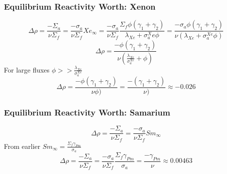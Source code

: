 \documentclass[]{article}
\begin{document}
		\subsubsection*{Equilibrium Reactivity Worth: Xenon}
		\[
		\Delta \rho = \frac{-\Sigma_a}{\nu\Sigma_f} = \frac{-\sigma_a}{\nu\Sigma_f} Xe_\infty = \frac{-\sigma_a}{\nu\Sigma_f} \frac{\Sigma_f\phi(\gamma_1+\gamma_2)}{\lambda_{Xe}+\sigma_a^Xe \phi} = \frac{-\sigma_a\phi(\gamma_1+\gamma_2)}{\nu(\lambda_{Xe}+\sigma_a^{Xe}\phi)}
		\]
		\[
		\Delta \rho = \frac{-\phi(\gamma_1+\gamma_2)}{\nu(\frac{\lambda_{Xe}}{\sigma_a^{Xe}}+\phi)} 
		\]
		For large fluxes $\phi >> \frac{\lambda_{Xe}}{\sigma_a^{Xe}}$
		\[
		\Delta \rho = \frac{-\phi(\gamma_1+\gamma_2)}{\nu\phi)} = \frac{-(\gamma_1+\gamma_2)}{\nu)} \approx -0.026  
		\]
		\subsubsection*{Equilibrium Reactivity Worth: Samarium}
		\[
		\Delta \rho = \frac{-\Sigma_a}{\nu\Sigma_f} = \frac{-\sigma_a}{\nu\Sigma_f} Sm_\infty 
		\]
		From earlier $Sm_\infty = \frac{\Sigma_f \gamma_{Pm}}{\sigma_a}$ 
		\[
		\Delta \rho = \frac{-\Sigma_a}{\nu\Sigma_f} = \frac{-\sigma_a}{\nu\Sigma_f} \frac{\Sigma_f \gamma_{Pm}}{\sigma_a} = \frac{-\gamma_{Pm}}{\nu}\approx0.00463 
		\]
			
\end{document}

